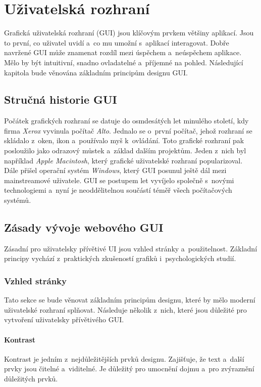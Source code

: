 \chapter{Uživatelská rozhraní}
Grafická uživatelská rozhraní (GUI) jsou klíčovým prvkem většiny aplikací. Jsou to první, co uživatel uvidí a~co mu umožní s~aplikací interagovat. Dobře navržené GUI může znamenat rozdíl mezi úspěchem a~neúspěchem aplikace. Mělo by být intuitivní, snadno ovladatelné a~příjemné na pohled. Následující kapitola bude věnována základním principům designu GUI.

\section{Stručná historie GUI}
Počátek grafických rozhraní se datuje do osmdesátých let minulého století, kdy firma \textit{Xerox} vyvinula počítač \textit{Alto}. Jednalo se o~první počítač, jehož rozhraní se skládalo z~oken, ikon a~používalo myš k~ovládání. Toto grafické rozhraní pak posloužilo jako odrazový můstek a~základ dalším projektům. Jeden z~nich byl například \textit{Apple Macintosh}, který grafické uživatelské rozhraní popularizoval. Dále přišel operační systém \textit{Windows}, který GUI posunul ještě dál mezi mainstreamové uživatele. GUI se postupem let vyvíjelo společně s~novými technologiemi a~nyní je neoddělitelnou součástí téměř všech počítačových systémů.

\section{Zásady vývoje webového GUI}
Zásadní pro uživatelsky přívětivé UI jsou vzhled stránky a~použitelnost. Základní principy vychází z~praktických zkušeností grafiků i~psychologických studií.

\subsection{Vzhled stránky}
Tato sekce se bude věnovat základním principům designu, které by mělo moderní uživatelské rozhraní splňovat. Následuje několik z~nich, které jsou důležité pro vytvoření uživatelsky přívětivého GUI. \cite{principles_of_design}

\subsubsection*{Kontrast}
Kontrast je jedním z~nejdůležitějších prvků designu. Zajišťuje, že text a~další prvky jsou čitelné a~viditelné. Je důležitý pro umocnění dojmu a~pro zvýraznění důležitých prvků.

